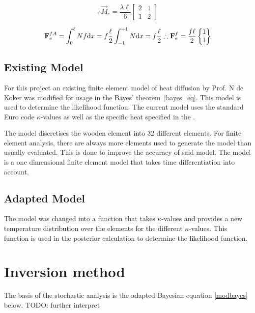 	\begin{equation}
	\therefore \vec{M}_e = \frac{\lambda \ell}{6} \begin{bmatrix} 2 & 1 \\ 1 & 2 \end{bmatrix}
	\end{equation}
	
	\begin{equation}
	\vec{F}_e^{fA} = \int_0^\ell N f \text{d}x = f \frac{\ell}{2} \int_{-1}^{+1} N \text{d}x = f\frac{\ell}{2} \\
\therefore \vec{F}_e^f = \frac{f\ell}{2} \begin{Bmatrix} 1\\1 \end{Bmatrix}
	\end{equation}
	\subsection{Existing Model}
	For this project an existing finite element model of heat diffusion by Prof. N de Koker was modified for usage in the Bayes' theorem~\ref{bayes_eq}. 
	This model is used to determine the likelihood function. 
	The current model uses the standard Euro code $\kappa$-values as well as the specific heat specified in the \citep{Euro:2004}. 
	
	The model discretises the wooden element into 32 different elements. For finite element analysis, there are always more elements used to generate the model than usually evaluated. This is done to improve the accuracy of said model.
	The model is a one dimensional finite element model that takes time differentiation into account.
	
	\subsection{Adapted Model}	
	The model was changed into a function that takes $\kappa$-values and provides a new temperature distribution over the elements for the different $\kappa$-values. 
	This function is used in the posterior calculation to determine the likelihood function.
	

\section{Inversion method}
The basis of the stochastic analysis is the adapted Bayesian equation \ref{modbayes} below. 
TODO: further interpret

